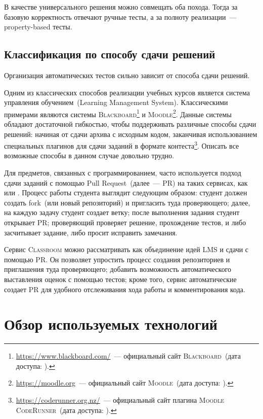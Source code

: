 В качестве универсального решения можно совмещать оба похода.
Тогда за базовую корректность отвечают ручные тесты, а за полноту реализации~--- property-based тесты.

\subsection{Классификация по способу сдачи решений}

Организация автоматических тестов сильно зависит от способа сдачи решений.

Одним из классических способов реализации учебных курсов является система управления обучением~(Learning Management System).
Классическими примерами являются системы \textsc{Blackboard}\footnote{\url{https://www.blackboard.com/}~--- официальный сайт \textsc{Blackboard}~(дата доступа: ).} и \textsc{Moodle}\footnote{\url{https://moodle.org}~--- официальный сайт \textsc{Moodle}~(дата доступа: ).}.
Данные системы обладают достаточной гибкостью, чтобы поддерживать различные способы сдачи решений: начиная от сдачи архива с исходным кодом, заканчивая использованием специальных плагинов для сдачи заданий в формате контеста\footnote{\url{https://coderunner.org.nz/}~--- официальный сайт плагина \textsc{Moodle CodeRunner}~(дата доступа: ).}.
Описать все возможные способы в данном случае довольно трудно.

Для предметов, связанных с программированием, часто используется подход сдачи заданий с помощью Pull Request~(далее~--- PR) на таких сервисах, как \GitHub{} или \gitlab{}.
Процесс работы студента выглядит следующим образом: студент должен создать fork~(или новый репозиторий) и пригласить туда проверяющего; далее, на каждую задачу студент создает ветку; после выполнения задания студент открывает PR; проверяющий проверяет решение, прохождение тестов, и либо засчитывает задание, либо просит исправить замечания.

Сервис \GitHub{} \textsc{Classroom} можно рассматривать как объединение идей LMS и сдачи с помощью PR.
Он позволяет упростить процесс создания репозиториев и приглашения туда проверяющего; добавить возможность автоматического выставления оценок с помощью тестов; кроме того, сервис автоматические создает PR для удобного отслеживания хода работы и комментирования кода.

\section{Обзор используемых технологий}

